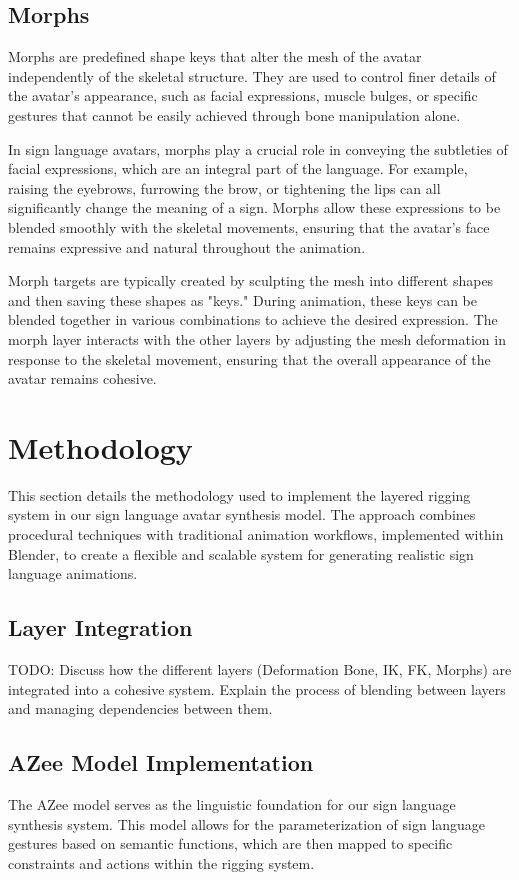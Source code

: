 \documentclass[../../main.tex]{subfiles}
\begin{document}
\subsection{Morphs}
Morphs are predefined shape keys that alter the mesh of the avatar independently of the skeletal structure. They are used to control finer details of the avatar's appearance, such as facial expressions, muscle bulges, or specific gestures that cannot be easily achieved through bone manipulation alone.

In sign language avatars, morphs play a crucial role in conveying the subtleties of facial expressions, which are an integral part of the language. For example, raising the eyebrows, furrowing the brow, or tightening the lips can all significantly change the meaning of a sign. Morphs allow these expressions to be blended smoothly with the skeletal movements, ensuring that the avatar's face remains expressive and natural throughout the animation.

Morph targets are typically created by sculpting the mesh into different shapes and then saving these shapes as "keys." During animation, these keys can be blended together in various combinations to achieve the desired expression. The morph layer interacts with the other layers by adjusting the mesh deformation in response to the skeletal movement, ensuring that the overall appearance of the avatar remains cohesive.

\section{Methodology}
This section details the methodology used to implement the layered rigging system in our sign language avatar synthesis model. The approach combines procedural techniques with traditional animation workflows, implemented within Blender, to create a flexible and scalable system for generating realistic sign language animations.

\subsection{Layer Integration}
TODO: Discuss how the different layers (Deformation Bone, IK, FK, Morphs) are integrated into a cohesive system. Explain the process of blending between layers and managing dependencies between them.

\subsection{AZee Model Implementation}
The AZee model serves as the linguistic foundation for our sign language synthesis system. This model allows for the parameterization of sign language gestures based on semantic functions, which are then mapped to specific constraints and actions within the rigging system.
\end{document}
